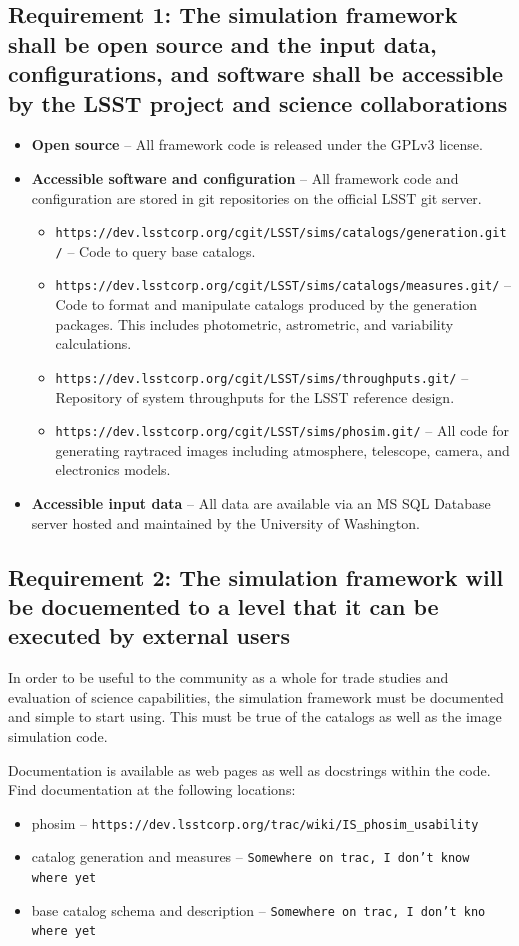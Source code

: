 \documentclass[]{article}
\begin{document}
\subsection{Requirement 1: The simulation framework shall be open source and the input data, configurations,
and software shall be accessible by the LSST project and science collaborations}
\begin{itemize}
\item {\bf Open source} -- All framework code is released under the GPLv3 license.
\item {\bf Accessible software and configuration} -- All framework code and configuration are 
stored in git repositories on the official LSST git server.
\begin{itemize}
\item {\tt https://dev.lsstcorp.org/cgit/LSST/sims/catalogs/generation.git/} -- Code to query
base catalogs.
\item {\tt https://dev.lsstcorp.org/cgit/LSST/sims/catalogs/measures.git/} -- Code to format
and manipulate catalogs produced by the generation packages.  This includes photometric, 
astrometric, and variability calculations.
\item {\tt https://dev.lsstcorp.org/cgit/LSST/sims/throughputs.git/} -- Repository
of system throughputs for the LSST reference design.
\item {\tt https://dev.lsstcorp.org/cgit/LSST/sims/phosim.git/} -- All code for generating
raytraced images including atmosphere, telescope, camera, and electronics models.
\end{itemize}
\item {\bf Accessible input data} -- All data are available via an MS SQL Database server
hosted and maintained by the University of Washington.
\end{itemize}

\subsection{Requirement 2: The simulation framework will be docuemented to a level that it can be
executed by external users}
In order to be useful to the community as a whole for trade studies and evaluation of science 
capabilities, the simulation framework must be documented and simple to start using.  This must
be true of the catalogs as well as the image simulation code. 

Documentation is available as web pages as well as docstrings within the code.  Find documentation
at the following locations:
\begin{itemize}
\item phosim -- {\tt https://dev.lsstcorp.org/trac/wiki/IS\_phosim\_usability}
\item catalog generation and measures -- {\tt Somewhere on trac, I don't know where yet}
\item base catalog schema and description -- {\tt Somewhere on trac, I don't kno where yet}
\end{itemize}
\end{document}
